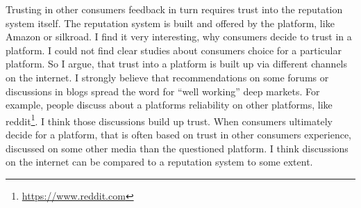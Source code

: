 Trusting in other consumers feedback in turn requires trust into the reputation system itself. The reputation system is built and offered by the platform, like Amazon or silkroad. I find it very interesting, why consumers decide to trust in a platform. I could not find clear studies about consumers choice for a particular platform. So I argue, that trust into a platform is built up via different channels on the internet. I strongly believe that recommendations on some forums or discussions in blogs spread the word for ``well working'' deep markets. For example, people discuss about a platforms reliability on other platforms, like reddit\footnote{\url{https://www.reddit.com}}. I think those discussions build up trust. When consumers ultimately decide for a platform, that is often based on trust in other consumers experience, discussed on some other media than the questioned platform. I think discussions on the internet can be compared to a reputation system to some extent.